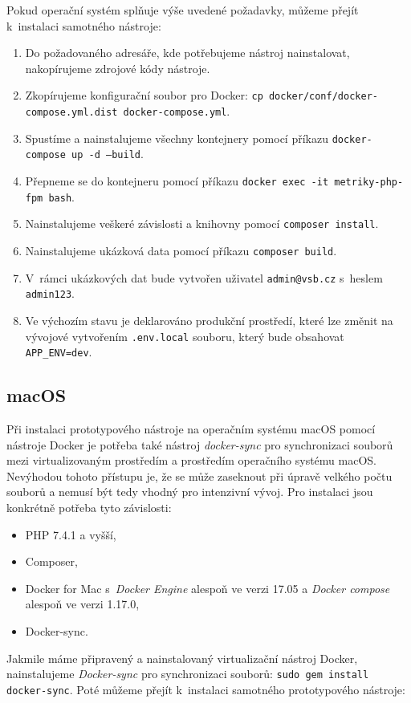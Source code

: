 \documentclass[czech,master]{diploma}
\begin{document}
Pokud operační systém splňuje výše uvedené požadavky, můžeme přejít k~instalaci samotného nástroje:
\begin{enumerate}
\item Do požadovaného adresáře, kde potřebujeme nástroj nainstalovat, nakopírujeme zdrojové kódy nástroje.
\item Zkopírujeme konfigurační soubor pro Docker: \texttt{cp docker/conf/docker-compose.yml.dist docker-compose.yml}.
\item Spustíme a nainstalujeme všechny kontejnery pomocí příkazu \texttt{docker-compose up -d --build}.
\item Přepneme se do kontejneru pomocí příkazu \texttt{docker exec -it metriky-php-fpm bash}.
\item Nainstalujeme veškeré závislosti a knihovny pomocí \texttt{composer install}.
\item Nainstalujeme ukázková data pomocí příkazu \texttt{composer build}.
\item V~rámci ukázkových dat bude vytvořen uživatel \texttt{admin@vsb.cz} s~heslem \texttt{admin123}.
\item Ve výchozím stavu je deklarováno produkční prostředí, které lze změnit na vývojové vytvořením \texttt{.env.local} souboru, který bude obsahovat \texttt{APP\_ENV=dev}.
\end{enumerate}

\subsection{macOS}
Při instalaci prototypového nástroje na operačním systému macOS pomocí nástroje Docker je potřeba také nástroj \textit{docker-sync} pro synchronizaci souborů mezi virtualizovaným prostředím a prostředím operačního systému macOS. Nevýhodou tohoto přístupu je, že se může zaseknout při úpravě velkého počtu souborů a nemusí být tedy vhodný pro intenzivní vývoj. Pro instalaci jsou konkrétně potřeba tyto závislosti:

\begin{itemize}
\item PHP 7.4.1 a vyšší,
\item Composer,
\item Docker for Mac s~\textit{Docker Engine} alespoň ve verzi 17.05 a \textit{Docker compose} alespoň ve verzi 1.17.0,
\item Docker-sync.
\end{itemize}

Jakmile máme připravený a nainstalovaný virtualizační nástroj Docker, nainstalujeme \textit{Docker-sync} pro synchronizaci souborů: \texttt{sudo gem install docker-sync}. Poté můžeme přejít k~instalaci samotného prototypového nástroje:
\end{document}
